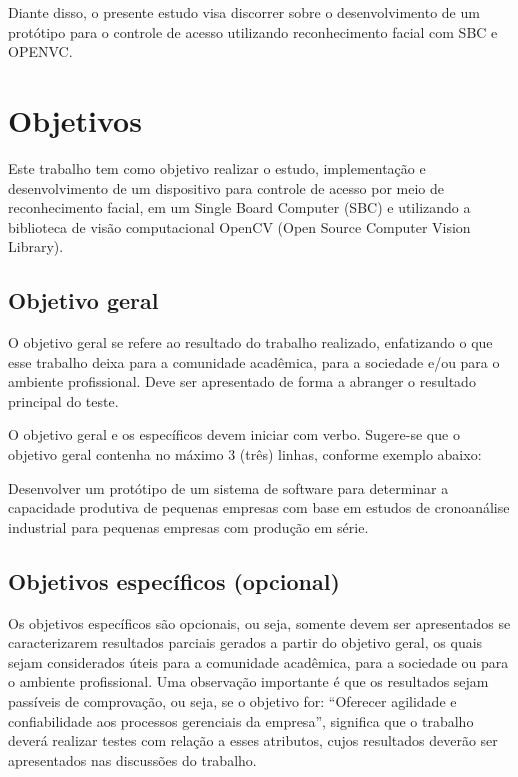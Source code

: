Diante disso, o presente estudo visa discorrer sobre o desenvolvimento de um protótipo para o controle de acesso utilizando reconhecimento facial com SBC e OPENVC.

\section{Objetivos}\label{sec:objetivos}

Este trabalho tem como objetivo realizar o estudo, implementação e desenvolvimento de um dispositivo para controle de acesso por meio de reconhecimento facial, em um Single Board Computer (SBC) e utilizando a biblioteca de visão computacional OpenCV (Open Source Computer Vision Library).

\subsection{Objetivo geral}\label{subsec:objetivoGeral}

O objetivo geral se refere ao resultado do trabalho realizado, enfatizando o que esse trabalho deixa para a comunidade acadêmica, para a sociedade e/ou para o ambiente profissional. Deve ser apresentado de forma a abranger o resultado principal do teste.

O objetivo geral e os específicos devem iniciar com verbo. Sugere-se que o objetivo geral contenha no máximo 3 (três) linhas, conforme exemplo abaixo:

Desenvolver um protótipo de um sistema de software para determinar a capacidade produtiva de pequenas empresas com base em estudos de cronoanálise industrial para pequenas empresas com produção em série.

\subsection{Objetivos específicos (opcional)}\label{subsec:objetivosEspecificos}

Os objetivos específicos são opcionais, ou seja, somente devem ser apresentados se caracterizarem resultados parciais gerados a partir do objetivo geral, os quais sejam considerados úteis para a comunidade acadêmica, para a sociedade ou para o ambiente profissional. Uma observação importante é que os resultados sejam passíveis de comprovação, ou seja, se o objetivo for: “Oferecer agilidade e confiabilidade aos processos gerenciais da empresa”, significa que o trabalho deverá realizar testes com relação a esses atributos, cujos resultados deverão ser apresentados nas discussões do trabalho.

